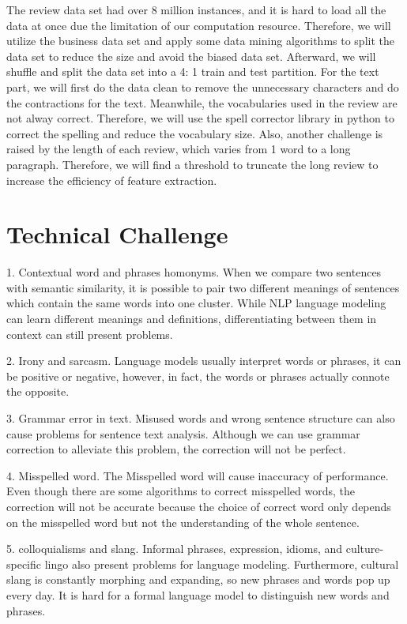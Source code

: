 \documentclass[11pt]{article}
\begin{document}
The review data set had over 8 million instances, and it is hard to load all the data at once due the limitation of our computation resource. Therefore, we will utilize the business data set and apply some data mining algorithms to split the data set to reduce the size and avoid the biased data set. Afterward, we will shuffle and split the data set into a 4: 1 train and test partition. For the text part, we will first do the data clean to remove the unnecessary characters and do the contractions for the text. Meanwhile, the vocabularies used in the review are not alway correct. Therefore, we will use the spell corrector library in python to correct the spelling and reduce the vocabulary size. Also, another challenge is raised by the length of each review, which varies from 1 word to a long paragraph. Therefore, we will find a threshold to truncate the long review to increase the efficiency of feature extraction.


\section{Technical Challenge}

1. Contextual word and phrases homonyms. When we compare two sentences with semantic similarity, it is possible to pair two different meanings of sentences which contain the same words into one cluster. While NLP language modeling can learn different meanings and definitions, differentiating between them in context can still present problems.

2. Irony and sarcasm. Language models usually interpret words or phrases, it can be positive or negative, however, in fact, the words or phrases actually connote the opposite.

3. Grammar error in text. Misused words and wrong sentence structure can also cause problems for sentence text analysis. Although we can use grammar correction to alleviate this problem, the correction will not be perfect.

4. Misspelled word. The Misspelled word will cause inaccuracy of performance. Even though there are some algorithms to correct misspelled words, the correction will not be accurate because the choice of correct word only depends on the misspelled word but not the understanding of the whole sentence.

5. colloquialisms and slang. Informal phrases, expression, idioms, and culture-specific lingo also present problems for language modeling. Furthermore, cultural slang is constantly morphing and expanding, so new phrases and words pop up every day. It is hard for a formal language model to distinguish new words and phrases.
\end{document}
